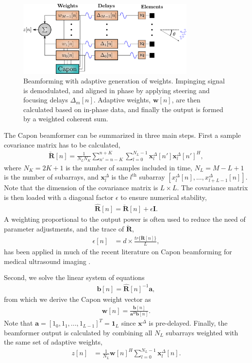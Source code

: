 \documentclass[conference]{IEEEtran}
\newcommand{\mat}[1]{\mathbf{#1}}
\renewcommand{\vec}[1]{\mathbf{#1}}
\begin{document}
\begin{figure}
\centerline{\includegraphics[width=3.5in]{gfx/beamforming_mv.pdf}}
\caption{Beamforming with adaptive generation of weights. Impinging signal is demodulated, and aligned in phase by applying steering and focusing delays $\Delta_m[n]$. Adaptive weights, $\vec{w}[n]$, are then calculated based on in-phase data, and finally the output is formed by a weighted coherent sum.}
\label{fig:mvbf}
\end{figure}

The Capon beamformer can be summarized in three main steps. First a sample covariance matrix has to be calculated,
\begin{align}
\mat{\breve{R}}[n] = \frac{1}{N_LN_K}\sum_{n'=n-K}^{n+K} \sum_{l=0}^{N_L-1} \vec{x}_l^{\Delta}[n']\vec{x}_l^{\Delta}[n']^H,\label{eq:R}
\end{align}
where  $N_K = 2K + 1$ is the number of samples included in time, $N_L = M-L+1$ is the number of subarrays, and $\vec{x}_l^{\Delta}$ is the $l^\text{th}$ subarray $[x_l^{\Delta}[n], \dotso, x_{l+L-1}^{\Delta}[n]]$. Note that the dimension of the covariance matrix is $L \times L$. The covariance matrix is then loaded with a diagonal factor $\epsilon$ to ensure numerical stability, 
\begin{align}\label{eq:diag}
\mat{\hat{R}}[n] = \mat{\breve{R}}[n] + \epsilon\mat{I}.
\end{align}
A weighting proportional to the output power is often used to reduce the need of parameter adjustments, and the trace of $\mat{\breve{R}}$, 
\begin{align}\label{eq:diag_adapt}
\epsilon[n] &= d \times \frac{tr\{\mat{\breve{R}}[n]\}}{L},
\end{align}
has been applied in much of the recent literature on Capon beamforming for medical ultrasound imaging \cite{Synnevag2007, Mehdizadeh2012}.

Second, we solve the linear system of equations 
\begin{align}\label{eq:b}
\vec{b}[n] = \mat{\hat{R}}[n]^{-1}\vec{a},
\end{align}
from which we derive the Capon weight vector as
\begin{align}\label{eq:w}
\vec{w}[n] = \frac{\vec{b}[n]}{\vec{a}^H\vec{b}[n]}.
\end{align}
Note that  $\vec{a} = [1_0, 1_1, ..., 1_{L-1}]^T = \vec{1}_L$ since $\vec{x}^\Delta$ is pre-delayed. 
Finally, the beamformer output is calculated by combining all $N_L$ subarrays weighted with the same set of adaptive weights,
\begin{align}
z[n] &= \frac{1}{N_L}\vec{w}[n]^H \sum_{l=0}^{N_L-1} \vec{x}_l^{\Delta}[n]. \label{eq:z_mv}
\end{align}
\end{document}
